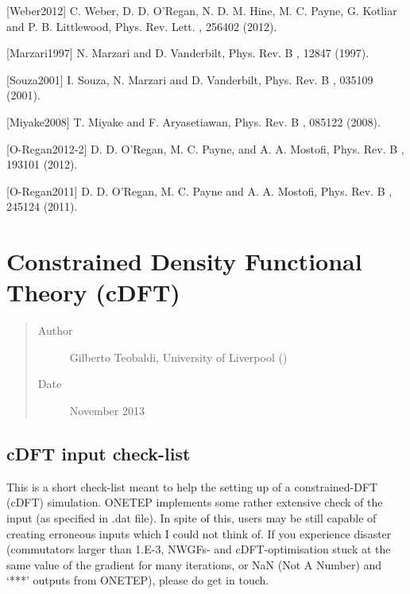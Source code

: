 \documentclass[letterpaper,10pt,english]{sphinxmanual}
\begin{document}
{[}Weber2012{]} C. Weber, D. D. O’Regan, N. D. M. Hine, M. C. Payne, G. Kotliar and P. B. Littlewood, Phys. Rev. Lett. , 256402 (2012).

{[}Marzari1997{]} N. Marzari and D. Vanderbilt, Phys. Rev. B , 12847 (1997).

{[}Souza2001{]} I. Souza, N. Marzari and D. Vanderbilt, Phys. Rev. B , 035109 (2001).

{[}Miyake2008{]} T. Miyake and F. Aryasetiawan, Phys. Rev. B , 085122 (2008).

{[}O-Regan2012-2{]} D. D. O’Regan, M. C. Payne, and A. A. Mostofi, Phys. Rev. B , 193101 (2012).

{[}O-Regan2011{]} D. D. O’Regan, M. C. Payne and A. A. Mostofi, Phys. Rev. B , 245124 (2011).


\section{Constrained Density Functional Theory (cDFT)}
\label{\detokenize{cDFT::doc}}\label{\detokenize{cDFT:constrained-density-functional-theory-cdft}}\begin{quote}\begin{description}
\item[{Author}] \leavevmode
Gilberto Teobaldi, University of Liverpool ()

\item[{Date}] \leavevmode
November 2013

\end{description}\end{quote}


\subsection{cDFT input check-list}
\label{\detokenize{cDFT:cdft-input-check-list}}
This is a short check-list meant to help the setting up of a
constrained-DFT (cDFT) simulation. ONETEP implements some rather
extensive check of the input (as specified in .dat file). In spite of
this, users may be still capable of creating erroneous inputs which I
could not think of. If you experience disaster (commutators larger than
1.E-3, NWGFs- and cDFT-optimisation stuck at the same value of the
gradient for many iterations, or NaN (Not A Number) and ‘***’ outputs
from ONETEP), please do get in touch.
\end{document}
